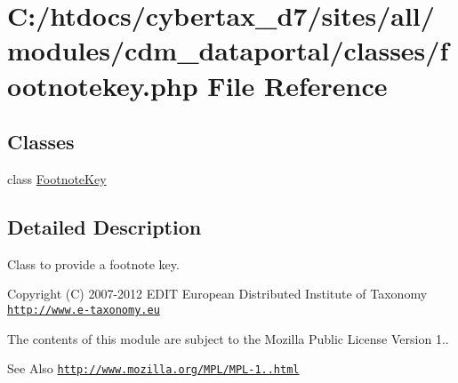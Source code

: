 \hypertarget{footnotekey_8php}{\section{C\-:/htdocs/cybertax\-\_\-d7/sites/all/modules/cdm\-\_\-dataportal/classes/footnotekey.php File Reference}
\label{footnotekey_8php}
}
\subsection*{Classes}
\begin{DoxyCompactItemize}
\item 
class \hyperlink{class_footnote_key}{Footnote\-Key}
\end{DoxyCompactItemize}


\subsection{Detailed Description}
Class to provide a footnote key.

\begin{DoxyCopyright}{Copyright}
(C) 2007-\/2012 E\-D\-I\-T European Distributed Institute of Taxonomy \href{http://www.e-taxonomy.eu}{\tt http\-://www.\-e-\/taxonomy.\-eu}
\end{DoxyCopyright}
The contents of this module are subject to the Mozilla Public License Version 1.. \begin{DoxySeeAlso}{See Also}
\href{http://www.mozilla.org/MPL/MPL-1.1.html}{\tt http\-://www.\-mozilla.\-org/\-M\-P\-L/\-M\-P\-L-\/1..\-html} 
\end{DoxySeeAlso}
